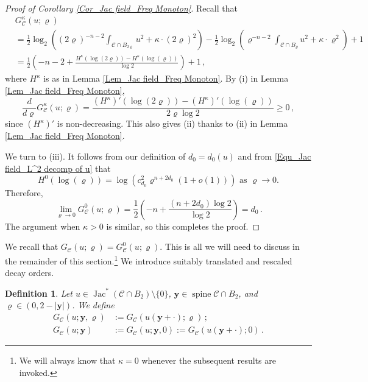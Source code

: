 \documentclass[11pt, letterpaper, reqno]{amsart}
\numberwithin{equation}{section}
\newtheorem{Def}{Definition}[section]
\theoremstyle{remark}
\newcommand{\cC}{\mathcal{C}}
\newcommand{\mbfy}{\mathbf{y}}
\newcommand{\Jac}{\operatorname{Jac}}
\newcommand{\spine}{\operatorname{spine}}
\begin{document}
    \begin{proof}[Proof of Corollary \ref{Cor_Jac field_Freq Monoton}]
      Recall that 
      \begin{align*}
        & G^\kappa_\cC(u; \varrho) \\
        & = \frac12 \log_2\left((2\varrho)^{-n-2}\int_{\cC \cap B_{2\varrho}} u^2 + \kappa \cdot (2\varrho)^2 \right) - \frac12 \log_2\left(\varrho^{-n-2}\int_{\cC \cap B_{\varrho}} u^2 + \kappa \cdot \varrho^2 \right) + 1 \\
        & = \frac12 \left( - n - 2 + \frac{H^\kappa(\log(2\varrho))-H^\kappa(\log(\varrho))}{\log 2}\right) + 1 \,,
      \end{align*}
      where $H^\kappa$ is as in Lemma \ref{Lem_Jac field_Freq Monoton}. By {(i)} in Lemma \ref{Lem_Jac field_Freq Monoton}, \[
        \frac{d}{d\varrho} G^\kappa_\cC(u; \varrho) = \frac{ (H^\kappa)'(\log(2\varrho))- (H^\kappa)'(\log(\varrho))}{2\varrho \log 2} \geq 0 \,,
      \]
      since $(H^\kappa)'$ is non-decreasing. This also gives {(ii)} thanks to {(ii)} in Lemma \ref{Lem_Jac field_Freq Monoton}.

      We turn to {(iii)}. It follows from our definition of $d_0 = d_0(u)$ and from \eqref{Equ_Jac field_L^2 decomp of u} that
      \[ H^0(\log(\varrho)) = \log(c_{d_0}^2 \varrho^{n+2d_0}(1+o(1))) \text{ as } \varrho \to 0. \]
      Therefore, 
      \[
        \lim_{\varrho \to 0} G^0_\cC(u; \varrho) = \frac12 \left( - n+ \frac{(n+2d_0)\log 2}{\log 2}\right) = d_0 \,.
      \]
      The argument when $\kappa>0$ is similar, so this completes the proof.
    \end{proof}
    
We recall that $G_\cC(u;\varrho) = G^0_\cC(u; \varrho)$. This is all we will need to discuss in the remainder of this section.\footnote{We will always know that $\kappa = 0$ whenever the subsequent results are invoked.} We introduce suitably translated and rescaled decay orders.

\begin{Def}
	Let $u \in \Jac^*(\cC \cap B_2) \setminus \{0\}$, $\mbfy \in \spine \cC \cap B_2$, and $\varrho \in (0, 2-|\mbfy|)$. We define
	\begin{align*}
		G_\cC(u; \mbfy, \varrho) & := G_\cC(u(\mbfy + \cdot); \varrho)\,; \\
		G_\cC(u; \mbfy) & := G_\cC(u; \mbfy, 0) := G_\cC(u(\mbfy + \cdot); 0)\,.
	\end{align*}
\end{Def}
 
\end{document}

